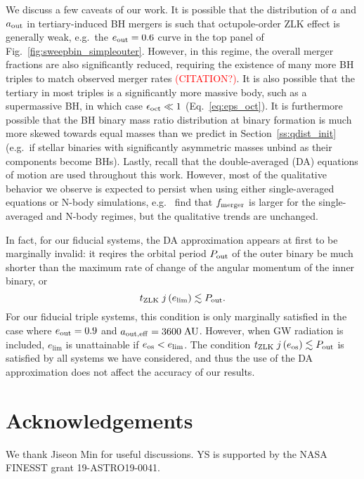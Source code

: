 \documentclass[
        fleqn,
        usenatbib,
    ]{mnras}
\newcommand*{\p}[1]{\left(#1\right)}
\begin{document}
We discuss a few caveats of our work. It is possible that the distribution of
$a$ and $a_{\rm out}$ in tertiary-induced BH mergers is such that octupole-order
ZLK effect is generally weak, e.g.\ the $e_{\rm out} = 0.6$ curve in the top
panel of Fig.~\ref{fig:sweepbin_simpleouter}. However, in this regime, the
overall merger fractions are also significantly reduced, requiring the existence
of many more BH triples to match observed merger rates
\textcolor{red}{(CITATION?)}. It is also possible that the tertiary in most
triples is a significantly more massive body, such as a supermassive BH, in
which case $\epsilon_{\rm oct} \ll 1$ (Eq.~\ref{eq:eps_oct}). It is furthermore
possible that the BH binary mass ratio distribution at binary formation is much
more skewed towards equal masses than we predict in Section~\ref{ss:qdist_init}
(e.g.\ if stellar binaries with significantly asymmetric masses unbind as their
components become BHs). Lastly, recall that the double-averaged (DA) equations
of motion are used throughout this work. However, most of the qualitative
behavior we observe is expected to persist when using either single-averaged
equations or N-body simulations, e.g.\ \citet{LL19} find that $f_{\rm merger}$
is larger for the single-averaged and N-body regimes, but the qualitative trends
are unchanged.

In fact, for our fiducial systems, the DA approximation appears at first to be
marginally invalid: it reqires the orbital period $P_{\rm out}$ of the outer
binary be much shorter than the maximum rate of change of the angular momentum
of the inner binary, or
\begin{equation}
    t_{\rm ZLK}\;j\p{e_{\lim}} \lesssim P_{\rm out}.
\end{equation}
For our fiducial triple systems, this condition is only marginally satisfied in
the case where $e_{\rm out} = 0.9$ and $a_{\rm out, eff} = 3600\;\mathrm{AU}$.
However, when GW radiation is included, $e_{\lim}$ is unattainable if $e_{\rm
os} < e_{\lim}$. The condition $t_{\rm ZLK}\;j\p{e_{\rm os}} \lesssim P_{\rm
out}$ is satisfied by all systems we have considered, and thus the use of the DA
approximation does not affect the accuracy of our results.

\section{Acknowledgements}\label{s:ack}

We thank Jiseon Min for useful discussions. YS is supported by the NASA FINESST
grant 19-ASTRO19-0041.%
\end{document}
